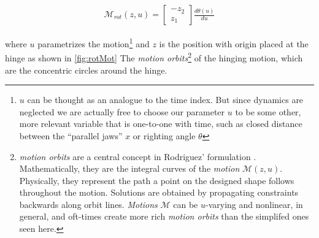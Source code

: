 \documentclass[letterpaper]{report}
\begin{document}
\begin{align}
\mathcal{M}_{rot}(z,u) = \begin{bmatrix} -z_2 \\ z_1 \end{bmatrix} \frac{d\theta(u)}{du}
\end{align}

where $u$ parametrizes the motion\footnote{$u$ can be thought as an analogue to the time index. But since dynamics are neglected we are actually free to choose our parameter $u$ to be some other, more relevant variable that is one-to-one with time, such as closed distance between the ``parallel jaws'' $x$ or righting angle $\theta$}
 and $z$ is the position with origin placed at the hinge as shown in \ref{fig:rotMot}
The \textit{motion orbits}\footnote{\textit{motion orbits} are a central concept in Rodriguez' formulation \cite{rodriguez2013effector}. Mathematically, they are the integral curves of the \textit{motion} $\mathcal{M}(z,u)$. Physically, they represent the path a point on the designed shape follows throughout the motion. Solutions are obtained by propagating constraints backwards along orbit lines. \textit{Motions} $\mathcal{M}$ can be $u$-varying and nonlinear, in general, and oft-times create more rich \textit{motion orbits} than the simplifed ones seen here.}
 of the hinging motion, which are the concentric circles around the hinge.
\end{document}
